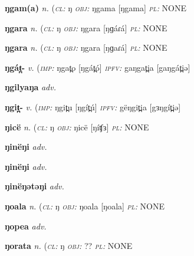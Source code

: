 {\newentry
\headword\textbf{ŋgam(a)}  
\ipa{[ŋgam(a)]} %
\synpos\textit{n.} 
\class(\textit{\textsc{cl:}} {ŋ}
\object\textit{\textsc{obj:}} ŋgama [ŋgama]
\plural\textit{\textsc{pl:}} NONE

\newentry
\headword\textbf{ŋgara}  
\ipa{[ŋɡáɾá]} %
\synpos\textit{n.} 
\class(\textit{\textsc{cl:}} {ŋ}
\object\textit{\textsc{obj:}} ŋgara [ŋɡáɾá]
\plural\textit{\textsc{pl:}} NONE

\newentry
\headword\textbf{ŋgara}  
\ipa{[ŋɡaɾá]}  
\synpos\textit{n.} 
\class(\textit{\textsc{cl:}} {ŋ}
\object\textit{\textsc{obj:}} ŋgara [ŋɡaɾá]
\plural\textit{\textsc{pl:}} NONE

\newentry
\headword\textbf{ŋgát̪-}  
\ipa{[ŋgát̪-]}
\synpos\textit{v.} 
\imperative(\textit {\textsc{imp:}} ŋgat̪o [ŋgát̪ó]
\imperfective\textit{\textsc{ipfv:}} gaŋgat̪ia [gaŋgát̪iə] 

\newentry
\headword\textbf{ŋgilyaŋa}  
\ipa{[ŋgíljáŋa]}
\synpos\textit{adv.} 

\newentry
\headword\textbf{ŋgit̪-}  
\ipa{[ŋgít̪-]}
\synpos\textit{v.} 
\imperative(\textit {\textsc{imp:}} ŋgit̪u [ŋgít̪ú]
\imperfective\textit{\textsc{ipfv:}} gëŋgit̪ia [gɜŋgít̪iə] 

\newentry
\headword\textbf{ŋicë}  
\ipa{[ŋíʧɜ]}  
\synpos\textit{n.} 
\class(\textit{\textsc{cl:}} {ŋ}
\object\textit{\textsc{obj:}} ŋicë [ŋíʧɜ]
\plural\textit{\textsc{pl:}} NONE

\newentry
\headword\textbf{ŋinëŋi}  
\ipa{[ŋinɜŋi]}
\synpos\textit{adv.} 

\newentry
\headword\textbf{ŋinëŋi}  
\ipa{[ŋínɜ́ŋí]}
\synpos\textit{adv.} 

\newentry
\headword\textbf{ŋinëŋətəŋi}  
\ipa{[ŋinɜŋətəŋi]}
\synpos\textit{adv.} 

\newentry
\headword\textbf{ŋoala}  
\ipa{[ŋoala]}  
\synpos\textit{n.} 
\class(\textit{\textsc{cl:}} {ŋ}
\object\textit{\textsc{obj:}} ŋoala [ŋoala]
\plural\textit{\textsc{pl:}} NONE

\newentry
\headword\textbf{ŋopea}  
\ipa{[ŋópéə]}
\synpos\textit{adv.} 

\newentry
\headword\textbf{ŋorata}  
\ipa{[ŋoɾátá]}  
\synpos\textit{n.} 
\class(\textit{\textsc{cl:}} {ŋ}
\object\textit{\textsc{obj:}} ??
\plural\textit{\textsc{pl:}} NONE

}
